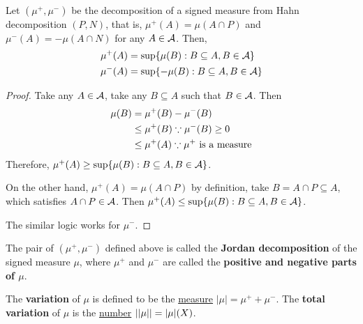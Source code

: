 \documentclass[11pt]{article}
\begin{document}
	\begin{proposition}
		Let $(\mu^+, \mu^-)$ be the decomposition of a signed measure from Hahn decomposition $(P, N)$, that is, $\mu^+(A) = \mu(A \cap P)$ and $\mu^-(A) = - \mu(A \cap N)$ for any $A \in \mathcal{{A}}$. Then,
		\begin{align}
			\mu^+(A) &= \sup\{\mu(B) : B \subseteq A, B \in \mathcal{{A}}\} \\
			\mu^-(A) &= \sup\{-\mu(B) : B \subseteq A, B \in \mathcal{{A}}\}
		\end{align}
		\begin{proof}
			Take any $A \in \mathcal{{A}}$, take any $B \subseteq A$ such that $B \in \mathcal{{A}}$. Then
			\begin{align}
				\mu(B) &= \mu^+(B) - \mu^-(B) \\
				&\leq \mu^+(B) \because \mu^-(B) \geq 0 \\
				&\leq \mu^+(A) \because \mu^+ \text{{ is a measure}}
			\end{align}
			Therefore, $\mu^+(A) \geq \sup\{\mu(B) : B \subseteq A, B \in \mathcal{{A}}\}$.
			
			On the other hand, $\mu^+(A) = \mu(A \cap P)$ by definition, take $B = A \cap P \subseteq A$, which satisfies $A \cap P \in \mathcal{{A}}$. Then $\mu^+(A) \leq \sup\{\mu(B) : B \subseteq A, B \in \mathcal{{A}}\}$.
			
			The similar logic works for $\mu^-$.
		\end{proof}
	\end{proposition}
	
	\begin{definition}
		The pair of $(\mu^+, \mu^-)$ defined above is called the \textbf{Jordan decomposition} of the signed measure $\mu$, where $\mu^+$ and $\mu^-$ are called the \textbf{positive and negative parts of $\mu$}.
	\end{definition}
	\begin{definition}
		The \textbf{variation} of $\mu$ is defined to be the \ul{measure} $|\mu| = \mu^+ + \mu^-$. The \textbf{total variation} of $\mu$ is the \ul{number} $\vert \vert {\mu} \vert \vert = |\mu|(X)$.
	\end{definition}
	
\end{document}
